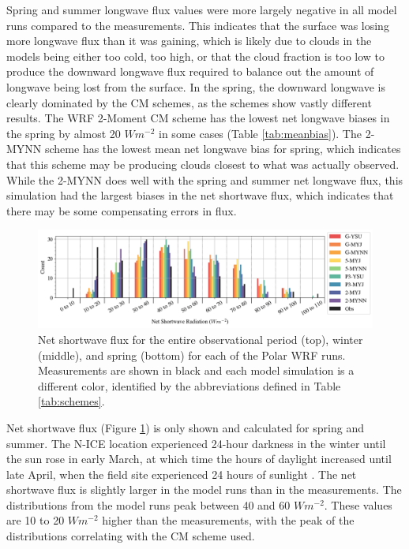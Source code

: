  Spring and summer longwave flux values were more largely negative in all model runs compared to the measurements. This indicates that the surface was losing more longwave flux than it was gaining, which is likely due to clouds in the models being either too cold, too high, or that the cloud fraction is too low to produce the downward longwave flux required to balance out the amount of longwave being lost from the surface. In the spring, the downward longwave is clearly dominated by the CM schemes, as the schemes show vastly different results. The WRF 2-Moment CM scheme has the lowest net longwave biases in the spring by almost 20 $Wm^{-2}$ in some cases (Table \ref{tab:meanbias}). The 2-MYNN scheme has the lowest mean net longwave bias for spring, which indicates that this scheme may be producing clouds closest to what was actually observed. While the 2-MYNN does well with the spring and summer net longwave flux, this simulation had the largest biases in the net shortwave flux, which indicates that there may be some compensating errors in flux.

\begin{figure}[h!]
    \centering
    \includegraphics[width=1\linewidth]{figures/chapter3/WRF_NetSW_Histo.png}
    \caption[Polar WRF simulated net shortwave flux histograms.]{Net shortwave flux for the entire observational period (top), winter (middle), and spring (bottom) for each of the Polar WRF runs. Measurements are shown in black and each model simulation is a different color, identified by the abbreviations defined in Table \ref{tab:schemes}.}
    \label{fig:wrf_netsw}
\end{figure}

Net shortwave flux (Figure \ref{fig:wrf_netsw}) is only shown and calculated for spring and summer. The N-ICE location experienced 24-hour darkness in the winter until the sun rose in early March, at which time the hours of daylight increased until late April, when the field site experienced 24 hours of sunlight \citep{walden:2017}. The net shortwave flux is slightly larger in the model runs than in the measurements. The distributions from the model runs peak between 40 and 60 $Wm^{-2}$. These values are 10 to 20 $Wm^{-2}$ higher than the measurements, with the peak of the distributions correlating with the CM scheme used. 

